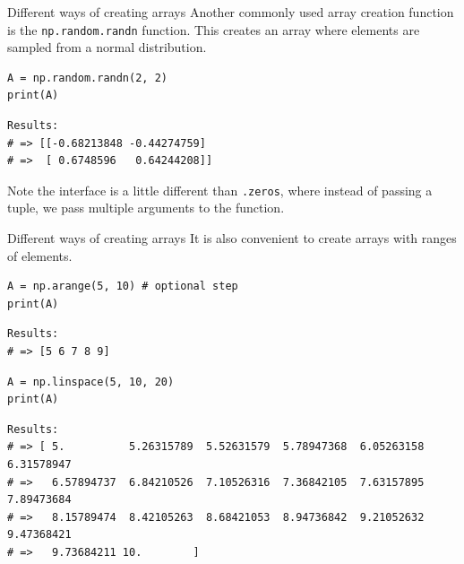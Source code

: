 \documentclass[10pt]{beamer}
\begin{document}
\begin{frame}[label={sec:org24843ee},fragile]{Different ways of creating arrays}
 Another commonly used array creation function is the \texttt{np.random.randn} function. This
creates an array where elements are sampled from a normal distribution.

\begin{verbatim}
A = np.random.randn(2, 2)
print(A)
\end{verbatim}

\begin{verbatim}
Results: 
# => [[-0.68213848 -0.44274759]
# =>  [ 0.6748596   0.64244208]]
\end{verbatim}


\alert{Note} the interface is a little different than \texttt{.zeros}, where instead of passing a
tuple, we pass multiple arguments to the function.
\end{frame}

\begin{frame}[label={sec:orgab83b23},fragile]{Different ways of creating arrays}
 It is also convenient to create arrays with ranges of elements.

\begin{verbatim}
A = np.arange(5, 10) # optional step
print(A)
\end{verbatim}

\begin{verbatim}
Results: 
# => [5 6 7 8 9]
\end{verbatim}


\begin{verbatim}
A = np.linspace(5, 10, 20)
print(A)
\end{verbatim}

\begin{verbatim}
Results: 
# => [ 5.          5.26315789  5.52631579  5.78947368  6.05263158  6.31578947
# =>   6.57894737  6.84210526  7.10526316  7.36842105  7.63157895  7.89473684
# =>   8.15789474  8.42105263  8.68421053  8.94736842  9.21052632  9.47368421
# =>   9.73684211 10.        ]
\end{verbatim}
\end{frame}
\end{document}
